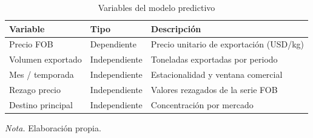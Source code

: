 \begin{table}[H]
\centering
\caption{Variables del modelo predictivo}
\label{tab:variables_modelo}
\small
\begin{tabularx}{\textwidth}{p{2.5cm}p{2cm}X}
\toprule
\textbf{Variable} & \textbf{Tipo} & \textbf{Descripci\'on} \\
\midrule
Precio FOB & Dependiente & Precio unitario de exportaci\'on (USD/kg) \\
Volumen exportado & Independiente & Toneladas exportadas por periodo \\
Mes / temporada & Independiente & Estacionalidad y ventana comercial \\
Rezago precio & Independiente & Valores rezagados de la serie FOB \\
Destino principal & Independiente & Concentraci\'on por mercado \\
\bottomrule
\end{tabularx}
\parbox{0.94\textwidth}{\small \textit{Nota.} Elaboraci\'on propia.}
\end{table}
